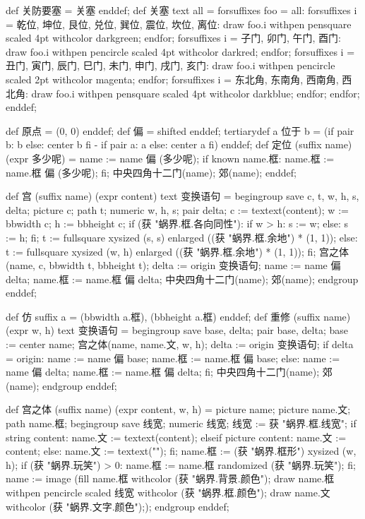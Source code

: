def 关防要塞 = 关塞 enddef;
def 关塞 text all =
  forsuffixes foo = all:
    forsuffixes i = 乾位, 坤位, 艮位, 兑位, 巽位, 震位, 坎位, 离位:
      draw foo.i withpen pensquare scaled 4pt withcolor darkgreen;
    endfor;
    forsuffixes i = 子门, 卯门, 午门, 酉门:
      draw foo.i withpen pencircle scaled 4pt withcolor darkred;
    endfor;
    forsuffixes i = 丑门, 寅门, 辰门, 巳门, 未门, 申门, 戌门, 亥门:
      draw foo.i withpen pencircle scaled 2pt withcolor magenta;
    endfor;
    forsuffixes i = 东北角, 东南角, 西南角, 西北角:
      draw foo.i withpen pensquare scaled 4pt withcolor darkblue;
    endfor;
  endfor;
enddef;
\stopMPinclusions

\startMPinclusions[+]
def 原点 = (0, 0) enddef;
def 偏 = shifted enddef;
tertiarydef a 位于 b =
  (if pair b: b else: center b fi - if pair a: a else: center a fi)
enddef;
def 定位 (suffix name) (expr 多少呢) =
  name := name 偏 (多少呢);
  if known name.框:
    name.框 := name.框 偏 (多少呢);
  fi;
  中央四角十二门(name); 郊(name);
enddef;
\stopMPinclusions

\startMPinclusions[+]
def 宫 (suffix name) (expr content) text 变换语句 =
  begingroup
    save c, t, w, h, s, delta; 
    picture c; 
    path t; 
    numeric w, h, s; 
    pair delta;
    c := textext(content); 
    w := bbwidth c; 
    h := bbheight c;
    if (获 "蜗界.框.各向同性"):
      if w > h: s := w; else: s := h; fi;
      t := fullsquare xysized (s, s) enlarged ((获 "蜗界.框.余地") * (1, 1));
    else:
      t := fullsquare xysized (w, h) enlarged ((获 "蜗界.框.余地") * (1, 1));
    fi;
    宫之体(name, c, bbwidth t, bbheight t);
    delta := origin 变换语句;
    name := name 偏 delta;
    name.框 := name.框 偏 delta;
    中央四角十二门(name); 郊(name);
  endgroup
enddef;

def 仿 suffix a = (bbwidth a.框), (bbheight a.框) enddef;
def 重修 (suffix name) (expr w, h) text 变换语句 =
  begingroup
    save base, delta; pair base, delta; base := center name;
    宫之体(name, name.文, w, h);
    delta := origin 变换语句;
    if delta = origin:
      name := name 偏 base;
      name.框 := name.框 偏 base;
    else:
      name := name 偏 delta;
      name.框 := name.框 偏 delta;
    fi;
    中央四角十二门(name); 郊(name);
  endgroup
enddef;

def 宫之体 (suffix name) (expr content, w, h) =
  picture name; picture name.文; path name.框;
  begingroup
    save 线宽; numeric 线宽; 线宽 := 获 "蜗界.框.线宽";
    if string content:
      name.文 := textext(content);
    elseif picture content:
      name.文 := content;
    else:
      name.文 := textext("");
    fi;
    name.框 := (获 "蜗界.框形") xysized (w, h);
    if (获 "蜗界.玩笑") > 0: name.框 := name.框 randomized (获 "蜗界.玩笑"); fi;
    name := image (fill name.框 withcolor (获 "蜗界.背景.颜色");
                   draw name.框 withpen pencircle scaled 线宽
                                withcolor (获 "蜗界.框.颜色");
                   draw name.文 withcolor (获 "蜗界.文字.颜色"););
  endgroup
enddef;
\stopMPinclusions

